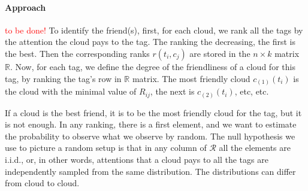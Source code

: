 \documentclass{llncs}
\begin{document}

\paragraph{Approach} \textcolor{red}{to be done!} To identify the friend(s), first, for each cloud, we rank all the tags by the attention the cloud pays to the tag. The ranking the decreasing, the first is the best. Then the corresponding ranks $r(t_i,c_j)$ are stored in the $n\times k$ matrix $\mathbb{R}$. Now, for each tag, we define the degree of the friendliness of a cloud for this tag, by ranking the tag's row in $\mathbb{R}$ matrix. The most friendly cloud $c_{(1)}(t_i)$ is the cloud with the minimal value of $R_{ij}$, the next is $c_{(2)}(t_i)$, etc, etc. 

If a cloud is the best friend, it is to be the most friendly cloud for the tag, but it is not enough. In any ranking, there is a first element, and we want to estimate the probability to observe what we observe by random. The null hypothesis we use to picture a random setup is that in any column of $\mathcal{R}$ all the elements are i.i.d., or, in other words, attentions that a cloud pays to all the tags are independently sampled from the same distribution. The distributions can differ from cloud to cloud. 
\end{document}
